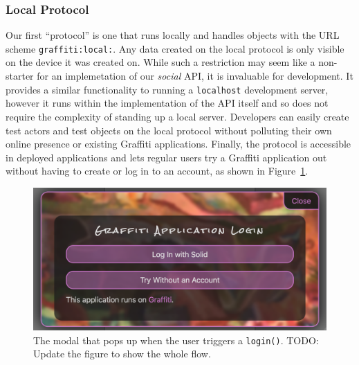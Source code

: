 



\subsubsection{Local Protocol}

Our first ``protocol'' is one that runs locally
and handles objects with the URL scheme \texttt{graffiti:local:}.
Any data created on the local protocol is only visible on the device
it was created on.
While such a restriction may seem like a non-starter for an implemetation
of our \emph{social} API, it is invaluable for development.
It provides a similar functionality to running a \texttt{localhost} development server,
however it runs within the implementation of the API itself and so
does not require the complexity of standing up a local server.
Developers can easily create test actors and test objects on the local protocol
without polluting their own online presence or existing Graffiti applications.
Finally, the protocol is accessible in deployed applications
and lets regular users try a Graffiti application out without
having to create or log in to an account, as shown in
Figure~\ref{above-and-below:login}.

\begin{figure}
    \label{above-and-below:login}
    \includegraphics{figures/login.png}
    \caption{The modal that pops up when the user triggers a \texttt{login()}. TODO: Update the figure to show the whole flow.}
\end{figure}


